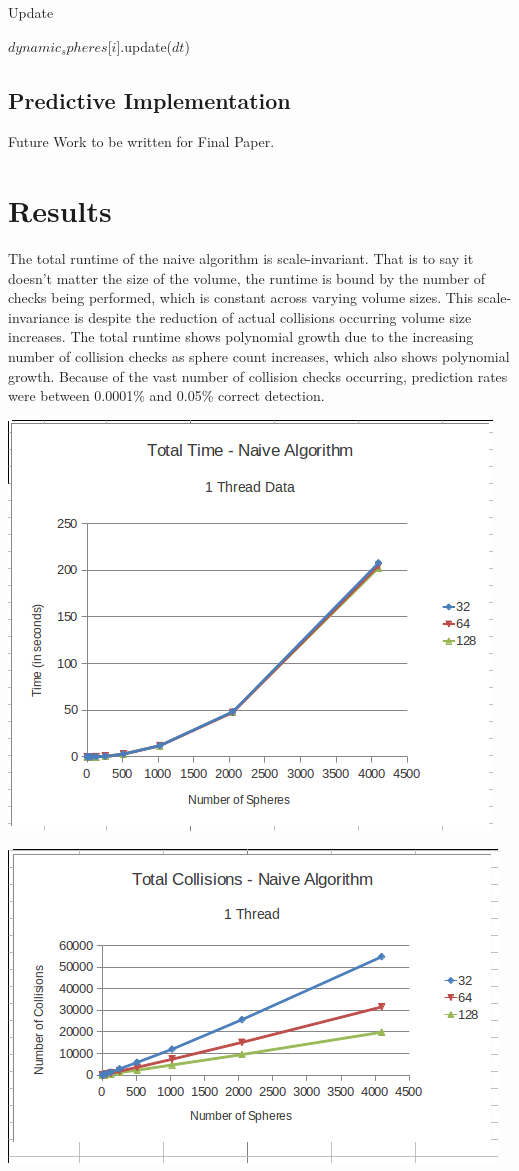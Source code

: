 \documentclass[conference]{IEEEtran}
\begin{document}
\begin{algorithm}
\caption{Update}
\begin{algorithmic}
	\STATE $dynamic_spheres$[$i$].update($dt$)
\ENDFOR
\end{algorithmic}
\end{algorithm}

\subsection{Predictive Implementation}

Future Work to be written for Final Paper.

\section{Results} %

The total runtime of the naive algorithm is scale-invariant.  That is to say it doesn't matter the size of the volume, the runtime is bound by the number of checks being performed, which is constant across varying volume sizes.  This scale-invariance is despite the reduction of actual collisions occurring volume size increases.  The total runtime shows polynomial growth due to the increasing number of collision checks as sphere count increases, which also shows polynomial growth.  Because of the vast number of collision checks occurring, prediction rates were between 0.0001\% and 0.05\% correct detection.

\begin{center}
	\includegraphics[width=.45\textwidth]{runtime_naive_1thread.png}
\end{center}

\begin{center}
	\includegraphics[width=.45\textwidth]{collisions_naive_1thread.png}
\end{center}
\end{document}
